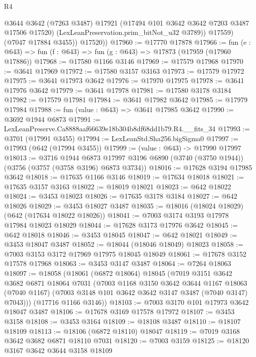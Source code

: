 \begin{lexlean}{R4}
\begin{coremodule}
              @3644
              @3642
              (@7263 @3487)
              @17921
              (@17494 @101 @3642 @3642 @7203 @3487 @17506 @17520)
              (LexLeanPreservation.prim_bitNot_u32 @3789))
            @17559)
          (@7047 @17884 @3455))
        @17520))
@17960 := @17770 @17878
@17966 := fun (e : @643) => fun (f : @643) => fun (g : @643) => @17873 (@17959 (@17960 @17886))
@17968 := @17580 @1166 @3146
@17969 := @17579 @17968
@17970 := @3641 @17969
@17972 := @17580 @3157 @3163
@17973 := @17579 @17972
@17975 := @3641 @17973 @3642
@17976 := @17970 @17975
@17978 := @3641 @17976 @3642
@17979 := @3641 @17978
@17981 := @17580 @3178 @3184
@17982 := @17579 @17981
@17984 := @3641 @17982 @3642
@17985 := @17979 @17984
@17988 := fun (value : @643) => @3641 @17985 @3642
@17990 := @3692 @1944 @6873
@17991 := LexLeanPreserve.Ca8888aaf66639e18b304b8df68dd1b79.R4.__fits_34
@17993 := @3701 (@17991 @3455)
@17994 := LexLeanStd.Sha256.bigSigma0
@17997 := @17993 (@642 (@17994 @3455))
@17999 := (value : @643) -> @17990 @17997
@18013 := @3716
    @1944
    @6873
    @17997
    @3196
    @6890
    (@3740 (@3750 @1944))
    (@3756 (@3757 (@3758 @3196) @6873 @3734))
@18016 := @17628 @3194 @17985 @3642
@18018 := @17635 @1166 @3146
@18019 := @17634 @18018
@18021 := @17635 @3157 @3163
@18022 := @18019 @18021
@18023 := @642 @18022
@18024 := @3453 @18023
@18026 := @17635 @3178 @3184
@18027 := @642 @18026
@18029 := @3453 @18027 @3487
@18035 := @18016 (@18024 @18029) (@642 (@17634 @18022 @18026))
@18041 := @7003 @3174 @3193 @17978 @17984 @18023 @18029
@18044 := @17628 @3173 @17976 @3642
@18045 := @642 @18018
@18046 := @3453 @18045
@18047 := @642 @18021
@18049 := @3453 @18047 @3487
@18052 := @18044 (@18046 @18049) @18023
@18058 := @7003 @3153 @3172 @17969 @17975 @18045 @18049
@18061 := @17678 @3152 @17578 @17968
@18063 := @3453 @3147 @3487
@18064 := @7264 @18063
@18097 := @18058
    (@18061
      (@6872 @18064)
      @18045
      (@7019
        @3151
        @3642
        @3682
        @6871
        @18064
        @7031
        (@7003
          @1168
          @3150
          @3642
          @3644
          @1167
          @18063
          (@7040 @1167)
          (@7003 @3148 @101 @3642 @3642 @3147 @3487 (@7040 @3147) @7043)))
      (@17716 @1166 @3146))
@18103 := @7003 @3170 @101 @17973 @3642 @18047 @3487
@18106 := @17678 @3169 @17578 @17972
@18107 := @3453 @3158
@18108 := @3453 @3164
@18109 := @18108 @3487
@18110 := @18107 @18109
@18113 := @18106 (@6872 @18110) @18047
@18119 := @7019 @3168 @3642 @3682 @6871 @18110 @7031
@18120 := @7003 @3159
@18125 := @18120 @3167 @3642 @3644 @3158 @18109

\end{coremodule}
\end{lexlean}
